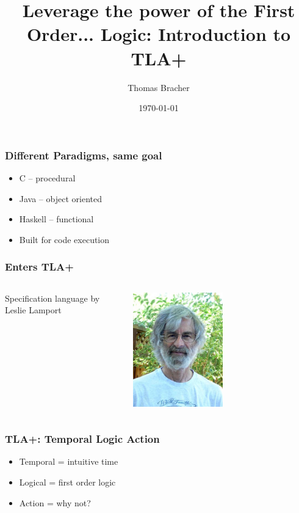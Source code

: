 \documentclass{beamer}
\title{Leverage the power of the First Order... Logic: Introduction to TLA+}
\author{Thomas Bracher}
\date{\today}
\begin{document}
\maketitle
\begin{frame}
  \frametitle{Different Paradigms, same goal}
  \begin{itemize}
    \item C -- procedural
    \item Java -- object oriented
    \item Haskell -- functional
    \item Built for code execution
  \end{itemize}
\end{frame}

\begin{frame}
  \frametitle{Enters TLA+}
  \begin{columns}
    \begin{column}{0.5\textwidth}
      Specification language by Leslie Lamport
    \end{column}
    \begin{column}{0.5\textwidth}
      \begin{center}
        \includegraphics[width=0.5\textwidth]{tla-introduction/leslie}
      \end{center}
    \end{column}
  \end{columns}
\end{frame}

\begin{frame}
  \frametitle{TLA+: Temporal Logic Action}
  \begin{itemize}
    \item Temporal = intuitive time
    \item Logical = first order logic
    \item Action = why not?
  \end{itemize}
\end{frame}
\end{document}
